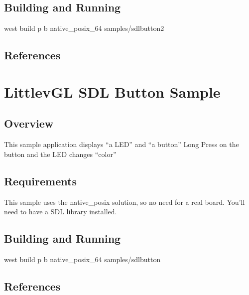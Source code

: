 \documentclass[letterpaper,10pt,english]{sphinxmanual}
\begin{document}
\subsection{Building and Running}
\label{\detokenize{samples/samplesbuttonsdlbutton2README:building-and-running}}
west build \sphinxhyphen{}p \sphinxhyphen{}b native\_posix\_64 samples/sdlbutton2


\subsection{References}
\label{\detokenize{samples/samplesbuttonsdlbutton2README:references}}

\section{LittlevGL SDL Button  Sample}
\label{\detokenize{samples/samplesbuttonsdlbuttonREADME:littlevgl-sdl-button-sample}}\label{\detokenize{samples/samplesbuttonsdlbuttonREADME:sdlb-sample}}\label{\detokenize{samples/samplesbuttonsdlbuttonREADME::doc}}

\subsection{Overview}
\label{\detokenize{samples/samplesbuttonsdlbuttonREADME:overview}}
This sample application displays “a LED” and “a button”
Long Press on the button and the LED changes “color”


\subsection{Requirements}
\label{\detokenize{samples/samplesbuttonsdlbuttonREADME:requirements}}
This sample uses the native\_posix solution, so no need for a real board.
You’ll need to have a SDL library installed.


\subsection{Building and Running}
\label{\detokenize{samples/samplesbuttonsdlbuttonREADME:building-and-running}}
west build \sphinxhyphen{}p \sphinxhyphen{}b native\_posix\_64 samples/sdlbutton


\subsection{References}
\label{\detokenize{samples/samplesbuttonsdlbuttonREADME:references}}
\end{document}

